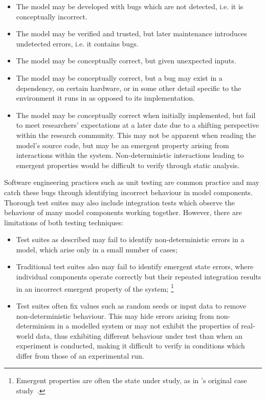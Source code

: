 \begin{itemize}
    \item The model may be developed with bugs which are not detected, i.e. it is
    conceptually incorrect.
    \item The model may be verified and trusted, but later maintenance introduces
    undetected errors, i.e. it contains bugs.
    \item The model may be conceptually correct, but given unexpected inputs.
    \item The model may be conceptually correct, but a bug may exist in a
    dependency, on certain hardware, or in some other detail specific to the
    environment it runs in as opposed to its implementation.
    \item The model may be conceptually correct when initially implemented, but
    fail to meet researchers' expectations at a later date due to a shifting
    perspective within the research community. This may not be apparent when
    reading the model's source code, but may be an emergent property arising
    from interactions within the system. Non-deterministic interactions leading
    to emergent properties would be difficult to verify through static analysis.
\end{itemize}

Software engineering practices such as unit testing are common practice and may
catch these bugs through identifying incorrect behaviour in model components.
Thorough test suites may also include integration tests which observe the
behaviour of many model components working together. However, there are
limitations of both testing techniques:

\begin{itemize}
    \item Test suites as described may fail to identify non-deterministic errors
    in a model, which arise only in a small number of cases;
    \item Traditional test suites also may fail to identify emergent state
    errors, where individual components operate correctly but their repeated
    integration results in an incorrect emergent property of the system;
    \footnote{Emergent properties are often the state under study, as in \pydysofu{}'s original
    case study~\cite{wallis2018caise}.}
    \item Test suites often fix values such as random seeds or input data to
    remove non-deterministic behaviour. This may hide errors arising from
    non-determinism in a modelled system or may not exhibit the properties of
    real-world data, thus exhibiting different behaviour under test than when an
    experiment is conducted, making it difficult to verify in conditions which
    differ from those of an experimental run.
\end{itemize}

